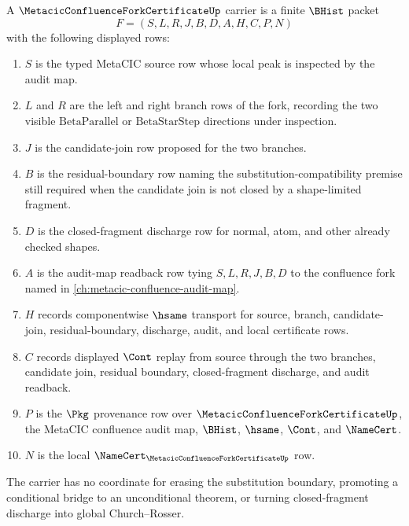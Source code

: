 \begin{definition}
\label{def:metacic-confluence-fork-certificate-carrier}
A $\MetacicConfluenceForkCertificateUp$ carrier is a finite $\BHist$ packet
$$
F=(S,L,R,J,B,D,A,H,C,P,N)
$$
with the following displayed rows:
\begin{enumerate}
\item $S$ is the typed MetaCIC source row whose local peak is inspected by the audit map.
\item $L$ and $R$ are the left and right branch rows of the fork, recording the two visible $\mathrm{BetaParallel}$ or $\mathrm{BetaStarStep}$ directions under inspection.
\item $J$ is the candidate-join row proposed for the two branches.
\item $B$ is the residual-boundary row naming the substitution-compatibility premise still required when the candidate join is not closed by a shape-limited fragment.
\item $D$ is the closed-fragment discharge row for normal, atom, and other already checked shapes.
\item $A$ is the audit-map readback row tying $S,L,R,J,B,D$ to the confluence fork named in \autoref{ch:metacic-confluence-audit-map}.
\item $H$ records componentwise $\hsame$ transport for source, branch, candidate-join, residual-boundary, discharge, audit, and local certificate rows.
\item $C$ records displayed $\Cont$ replay from source through the two branches, candidate join, residual boundary, closed-fragment discharge, and audit readback.
\item $P$ is the $\Pkg$ provenance row over $\MetacicConfluenceForkCertificateUp$, the MetaCIC confluence audit map, $\BHist$, $\hsame$, $\Cont$, and $\NameCert$.
\item $N$ is the local $\NameCert_{\MetacicConfluenceForkCertificateUp}$ row.
\end{enumerate}
The carrier has no coordinate for erasing the substitution boundary, promoting a conditional bridge to an unconditional theorem, or turning closed-fragment discharge into global Church--Rosser.
\end{definition}

